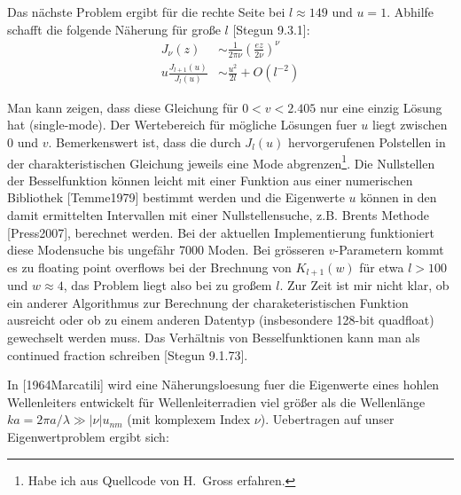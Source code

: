 \documentclass{article}
\def\({\left(}
\def\){\right)}
\begin{document}
Das n\"achste Problem ergibt f\"ur die rechte Seite bei $l\approx 149$
und $u=1$. Abhilfe schafft die folgende N\"aherung f\"ur gro\ss e $l$
[Stegun 9.3.1]:
\begin{align}
  J_\nu(z)&\sim \frac{1}{2\pi\nu}\(\frac{ez}{2\nu}\)^\nu \\
  u\frac{J_{l+1}(u)}{J_l(u)} &\sim \frac{u^2}{2l} + O(l^{-2})
\end{align}


Man kann zeigen, dass diese Gleichung f\"ur $0<v<2.405$ nur eine
einzig L\"osung hat (single-mode). Der Wertebereich f\"ur m\"ogliche
L\"osungen fuer $u$ liegt zwischen 0 und $v$. Bemerkenswert ist, dass
die durch $J_l(u)$ hervorgerufenen Polstellen in der
charakteristischen Gleichung jeweils eine Mode abgrenzen\footnote{Habe
  ich aus Quellcode von H.~Gross erfahren.}. Die Nullstellen der
Besselfunktion k\"onnen leicht mit einer Funktion aus einer
numerischen Bibliothek [Temme1979] bestimmt werden und die Eigenwerte
$u$ k\"onnen in den damit ermittelten Intervallen mit einer
Nullstellensuche, z.B. Brents Methode [Press2007], berechnet werden.
Bei der aktuellen Implementierung funktioniert diese Modensuche bis
ungef\"ahr 7000 Moden. Bei gr\"osseren $v$-Parametern kommt es zu
floating point overflows bei der Brechnung von $K_{l+1}(w)$ f\"ur etwa
$l>100$ und $w\approx 4$, das Problem liegt also bei zu gro\ss em
$l$. Zur Zeit ist mir nicht klar, ob ein anderer Algorithmus zur
Berechnung der charaketeristischen Funktion ausreicht oder ob zu einem
anderen Datentyp (insbesondere 128-bit quadfloat) gewechselt werden
muss. Das Verh\"altnis von Besselfunktionen kann man als continued
fraction schreiben [Stegun 9.1.73]. 

In [1964Marcatili] wird eine N\"aherungsloesung fuer die Eigenwerte
eines hohlen Wellenleiters entwickelt f\"ur Wellenleiterradien viel
gr\"o\ss er als die Wellenl\"ange $ka = 2\pi a/\lambda \gg |\nu|
u_{nm}$ (mit komplexem Index $\nu$). Uebertragen auf unser
Eigenwertproblem ergibt sich:
\end{document}
